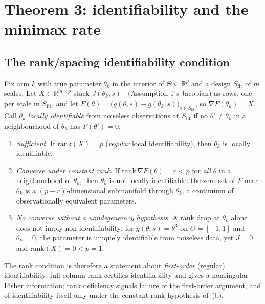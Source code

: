 %

\section{Theorem 3: identifiability and the minimax rate}
\label{sec:theorem3}

\subsection{The rank/spacing identifiability condition}
\label{sec:theorem3-rank}

\begin{theorem}
\label{thm:identifiability}
Fix arm $k$ with true parameter $\theta_k$ in the interior of $\Theta \subseteq \mathbb{R}^p$ and a design $S_{\mathrm{fit}}$ of
$m$ scales. Let $X \in \mathbb{R}^{m \times p}$ stack $J(\theta_k, s)^\top$ (Assumption
1's Jacobian) as rows, one per scale in $S_{\mathrm{fit}}$, and let
$F(\theta) = \big(g(\theta,s) - g(\theta_k,s)\big)_{s \in S_{\mathrm{fit}}}$, so
$\nabla F(\theta_k) = X$. Call $\theta_k$ \emph{locally identifiable} from noiseless
observations at $S_{\mathrm{fit}}$ if no $\theta' \ne \theta_k$ in a neighbourhood of
$\theta_k$ has $F(\theta') = 0$.
\begin{enumerate}
  \item[(a)] \emph{Sufficient.} If $\mathrm{rank}(X) = p$ (\emph{regular} local
    identifiability), then $\theta_k$ is locally identifiable.
  \item[(b)] \emph{Converse under constant rank.} If $\mathrm{rank}\,\nabla F(\theta) = r < p$
    for \emph{all} $\theta$ in a neighbourhood of $\theta_k$, then $\theta_k$ is not locally
    identifiable: the zero set of $F$ near $\theta_k$ is a $(p-r)$-dimensional submanifold
    through $\theta_k$, a continuum of observationally equivalent parameters.
  \item[(c)] \emph{No converse without a nondegeneracy hypothesis.} A rank drop at
    $\theta_k$ alone does not imply non-identifiability: for $g(\theta, s) = \theta^3$ on
    $\Theta = [-1,1]$ and $\theta_k = 0$, the parameter is uniquely identifiable from noiseless
    data, yet $J = 0$ and $\mathrm{rank}(X) = 0 < p = 1$.
\end{enumerate}
The rank condition is therefore a statement about \emph{first-order} (regular)
identifiability: full column rank certifies identifiability and gives a nonsingular Fisher
information; rank deficiency signals failure of the first-order argument, and of
identifiability itself only under the constant-rank hypothesis of~(b).
\end{theorem}

